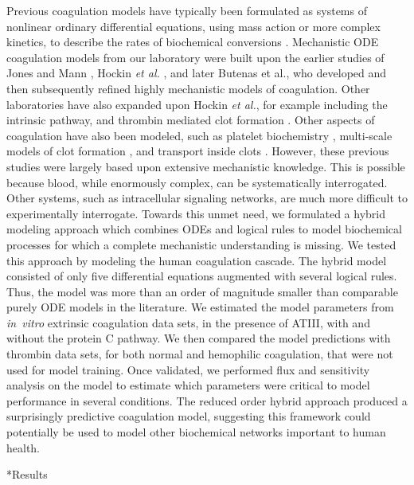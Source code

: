 \documentclass[12pt]{article}
\makeatletter
\renewcommand\section{\@startsection
	{subsection}{2}{0mm}
	{-0.2in}
	{0.05\baselineskip}
	{\normalfont\large\bfseries}}
\makeatother
\begin{document}
Previous coagulation models have typically been formulated as systems of nonlinear ordinary differential equations, 
using mass action or more complex kinetics, to describe the rates of biochemical conversions \citep{Kuharsky:2001aa}.
Mechanistic ODE coagulation models from our laboratory \citep{Luan:2007aa,2010_luan_varner_MolBioSys} 
were built upon the earlier studies of Jones and Mann \citep{Jones:1994aa}, Hockin \emph{et al.} \citep{Hockin:2002aa}, and later Butenas et al., \citep{Butenas:2004aa}
who developed and then subsequently refined highly mechanistic models of coagulation. 
Other laboratories have also expanded upon Hockin \emph{et al.}, for example including the intrinsic pathway, and thrombin mediated clot formation \citep{Chatterjee:2010aa}. 
Other aspects of coagulation have also been modeled, such as platelet biochemistry \citep{Stalker:2013aa}, 
multi-scale models of clot formation \citep{Leiderman:2014aa, Bannish:2014ab}, and transport inside clots \citep{Voronov:2013aa}.
However, these previous studies were largely based upon extensive mechanistic knowledge. 
This is possible because blood, while enormously complex, can be systematically interrogated.
Other systems, such as intracellular signaling networks, are much more difficult to experimentally interrogate.  
Towards this unmet need, we formulated a hybrid modeling approach which combines ODEs and logical rules to model 
biochemical processes for which a complete mechanistic understanding is missing. 
We tested this approach by modeling the human coagulation cascade. 
The hybrid model consisted of only five differential equations augmented with several logical rules.
Thus, the model was more than an order of magnitude smaller than comparable purely ODE models in the literature.
We estimated the model parameters from \textit{in~vitro} extrinsic coagulation data sets, in the presence of ATIII, with and without the protein C pathway. 
We then compared the model predictions with thrombin data sets, for both normal and hemophilic coagulation, that were not used for model training.
Once validated, we performed flux and sensitivity analysis on the model to estimate which parameters were critical to model performance in several conditions. 
The reduced order hybrid approach produced a surprisingly predictive coagulation model, 
suggesting this framework could potentially be used to model other biochemical networks important to human health. 

\clearpage

\section*{Results}
\end{document}
